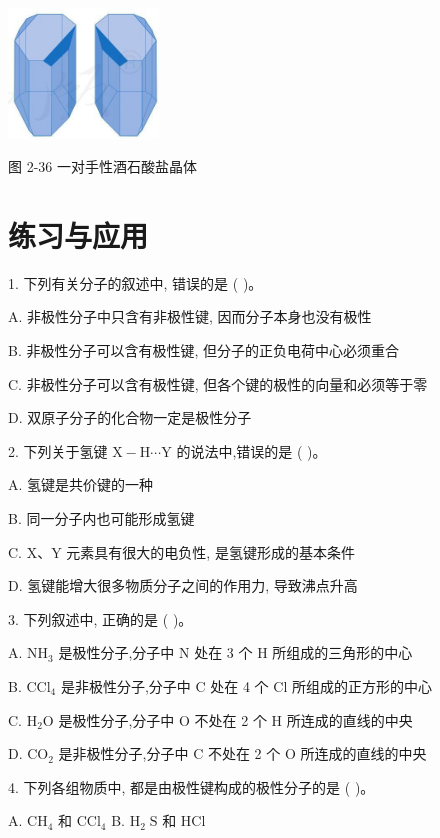 \documentclass[10pt]{article}
\begin{document}
\begin{center}
\includegraphics[max width=0.3\textwidth]{images/0190e026-5a11-7df7-bd27-54d09026ba7a_64_404744.jpg}
\end{center}

图 2-36 一对手性酒石酸盐晶体

\section*{练习与应用}

1. 下列有关分子的叙述中, 错误的是 ( )。

A. 非极性分子中只含有非极性键, 因而分子本身也没有极性

B. 非极性分子可以含有极性键, 但分子的正负电荷中心必须重合

C. 非极性分子可以含有极性键, 但各个键的极性的向量和必须等于零

D. 双原子分子的化合物一定是极性分子

2. 下列关于氢键 \(\mathrm{X} - \mathrm{H}\cdots \mathrm{Y}\) 的说法中,错误的是 ( )。

A. 氢键是共价键的一种

B. 同一分子内也可能形成氢键

C. X、Y 元素具有很大的电负性, 是氢键形成的基本条件

D. 氢键能增大很多物质分子之间的作用力, 导致沸点升高

3. 下列叙述中, 正确的是 ( )。

A. \({\mathrm{{NH}}}_{3}\) 是极性分子,分子中 \(\mathrm{N}\) 处在 3 个 \(\mathrm{H}\) 所组成的三角形的中心

B. \({\mathrm{{CCl}}}_{4}\) 是非极性分子,分子中 \(\mathrm{C}\) 处在 4 个 \(\mathrm{{Cl}}\) 所组成的正方形的中心

C. \({\mathrm{H}}_{2}\mathrm{O}\) 是极性分子,分子中 \(\mathrm{O}\) 不处在 2 个 \(\mathrm{H}\) 所连成的直线的中央

D. \({\mathrm{{CO}}}_{2}\) 是非极性分子,分子中 \(\mathrm{C}\) 不处在 2 个 \(\mathrm{O}\) 所连成的直线的中央

4. 下列各组物质中, 都是由极性键构成的极性分子的是 ( )。

A. \({\mathrm{{CH}}}_{4}\) 和 \({\mathrm{{CCl}}}_{4}\) B. \({\mathrm{H}}_{2}\mathrm{\;S}\) 和 \(\mathrm{{HCl}}\)
\end{document}
